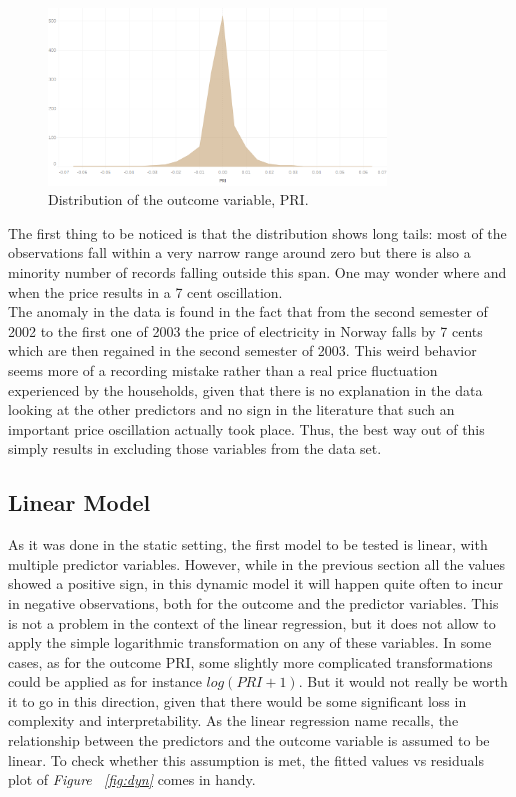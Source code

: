 \documentclass[a4paper,12pt]{book}
\begin{document}
\begin{figure}[tb]
\begin{center}
\captionsetup{justification=centering}
\includegraphics[width=0.8\textwidth]{Images/prihi.png}
\caption{Distribution of the outcome variable, PRI.}
\label{fig:pri}
\end{center}
\end{figure}

The first thing to be noticed is that the distribution shows long tails: most of the observations fall within a very narrow range around zero but there is also a minority number of records falling outside this span. One may wonder where and when the price results in a 7 cent oscillation.\\

The anomaly in the data is found in the fact that from the second semester of 2002 to the first one of 2003 the price of electricity in Norway falls by 7 cents which are then regained in the second semester of 2003. This weird behavior seems more of a recording mistake rather than a real price fluctuation experienced by the households, given that there is no explanation in the data looking at the other predictors and no sign in the literature that such an important price oscillation actually took place. Thus, the best way out of this simply results in excluding those variables from the data set.

\subsection{Linear Model}

As it was done in the static setting, the first model to be tested is linear, with multiple predictor variables. However, while in the previous section all the values showed a positive sign, in this dynamic model it will happen quite often to incur in negative observations, both for the outcome and the predictor variables. This is not a problem in the context of the linear regression, but it does not allow to apply the  simple logarithmic transformation on any of these variables. In some cases, as for the outcome PRI, some slightly more complicated transformations could be applied as for instance $log(PRI+1)$. But it would not really be worth it to go in this direction, given that there would be some significant loss in complexity and interpretability. As the linear regression name recalls, the relationship between the predictors and the outcome variable is assumed to be linear. To check whether this assumption is met, the fitted values vs residuals plot of \textit{Figure ~\ref{fig:dyn}} comes in handy.\\
\end{document}
